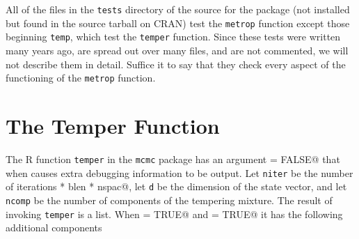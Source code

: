 \documentclass{article}
\begin{document}
All of the files in the \texttt{tests} directory of the source for the
package (not installed but found in the source tarball on CRAN) test
the \texttt{metrop} function except those beginning \texttt{temp},
which test the \texttt{temper} function.  Since these tests were written
many years ago, are spread out over many files, and are not commented,
we will not describe them in detail.  Suffice it to say that they check
every aspect of the functioning of the \texttt{metrop} function.

\section{The Temper Function}

The R function \texttt{temper} in the \texttt{mcmc} package has an argument
\verb@debug = FALSE@ that when \verb@TRUE@ causes extra debugging information
to be output.
Let \texttt{niter} be the number of iterations
\verb@nbatch * blen * nspac@, let \texttt{d} be the dimension of the state
vector, and let \texttt{ncomp} be the number of components of the tempering
mixture.
The result of invoking \texttt{temper} is a list.  When
\verb@debug = TRUE@ and \verb@parallel = TRUE@ it has the following additional
components
\end{document}
